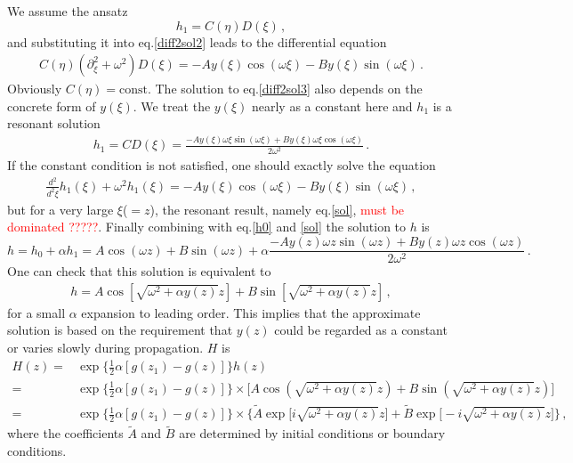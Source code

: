 \documentclass[
 jor,
 amsmath,amssymb,preprint,
]{revtex4-2}
\begin{document}
We assume the ansatz
\begin{equation}
h_1 = C(\eta)D(\xi)\,,
\end{equation}
and substituting it into eq.\eqref{diff2sol2} leads to the differential equation
\begin{equation}
\begin{aligned}
C(\eta)(\partial_\xi^2 + \omega^2) D(\xi) = -Ay(\xi)\cos(\omega\xi) -B  y (\xi)\sin(\omega\xi)\,. \label{diff2sol3}
\end{aligned}
\end{equation}
Obviously $C(\eta) = \mathrm{const}$. The solution to eq.\eqref{diff2sol3} also depends on the concrete form of $y(\xi)$. We treat the $y(\xi)$ nearly as a constant here and $h_1$ is a resonant solution
\begin{align}
h_1 = CD(\xi) = \frac{-Ay(\xi)\omega\xi\sin(\omega\xi) + By(\xi)\omega\xi\cos(\omega\xi)}{2\omega^2}\,. \label{sol}
\end{align}
If the constant condition is not satisfied, one should 
exactly solve the equation
\begin{equation}
\begin{aligned}
\frac{d^2}{d^2\xi}h_1(\xi) + \omega^2 h_1(\xi) = -Ay(\xi)\cos(\omega\xi) -B  y (\xi)\sin(\omega\xi)\,, \label{desfirorddiffeq}
\end{aligned}
\end{equation}
but for a very large $\xi$($=z$), the resonant result, namely eq.\eqref{sol}, \textcolor{red}{must be dominated ?????}. Finally combining with eq.\eqref{h0} and \eqref{sol} the solution to $h$ is
\begin{equation}
h = h_0 + \alpha h_1 = A\cos(\omega z) + B\sin(\omega z) + \alpha \frac{-Ay(z)\omega z\sin(\omega z) + By(z)\omega z\cos(\omega z)}{2\omega^2}\,.
\end{equation}
One can check that this solution is equivalent to 
\begin{align}
h = A \cos[\sqrt{\omega^2 + \alpha y(z)} z] + B \sin[\sqrt{\omega^2 + \alpha y(z)} z]\,,
\end{align}
for a small $\alpha$ expansion to leading order. This implies that the approximate solution is based on the requirement that $y(z)$ could be regarded as a constant or varies slowly during propagation. $H$ is
\begin{equation}
\begin{aligned}
H(z) = & \exp\bigg\{ \frac{1}{2}\alpha [g(z_1)-g(z)] \bigg\} h(z) \\
= & \exp\bigg\{ \frac{1}{2}\alpha [g(z_1)-g(z)] \bigg\} \times \bigg[A \cos(\sqrt{\omega^2 + \alpha y(z)} z) + B \sin(\sqrt{\omega^2 + \alpha y(z)} z) \bigg] \\
= & \exp\bigg\{ \frac{1}{2}\alpha [g(z_1)-g(z)] \bigg\} \times \bigg\{\tilde{A} \exp\bigg[i\sqrt{\omega^2 + \alpha y(z)} z\bigg] + \tilde{B} \exp\bigg[-i\sqrt{\omega^2 + \alpha y(z)} z\bigg] \bigg\} \,, \label{finalsol}
\end{aligned}
\end{equation}
where the coefficients $\tilde{A}$ and $\tilde{B}$ are determined by initial conditions or boundary conditions. 
\end{document}
